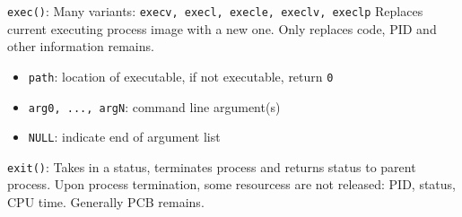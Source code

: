 \documentclass[10pt,landscape]{article}
\begin{document}
\begin{multicols*}{3}

\verb|exec()|: Many variants: \verb|execv, execl, execle, execlv, execlp| Replaces current executing process image with a new one.
Only replaces code, PID and other information remains.
\begin{itemize}[topsep=0pt,noitemsep,wide=0pt, leftmargin=\dimexpr{} + 2\relax, topsep=0pt]
    \item \verb|path|: location of executable, if not executable, return \verb|0|
    \item \verb|arg0, ..., argN|: command line argument(s)
    \item \verb|NULL|: indicate end of argument list
\end{itemize}

\verb|exit()|: Takes in a status, terminates process and returns status to parent process.
Upon process termination, some resourcess are not released: PID, status, CPU time. Generally PCB remains.



\end{multicols*}
\end{document}
